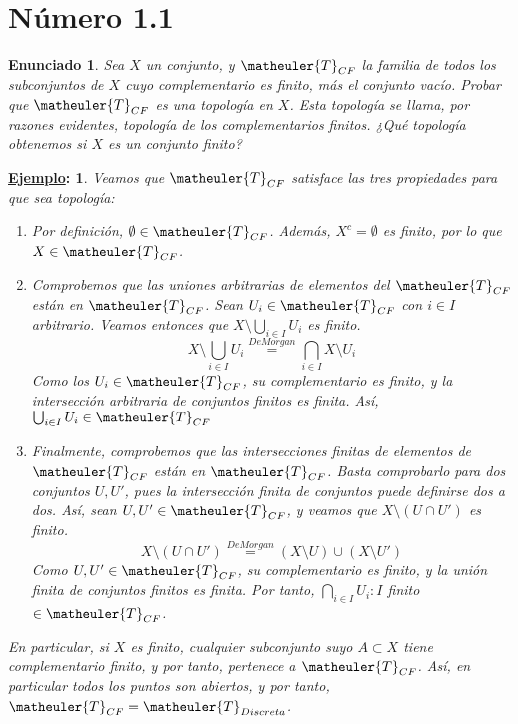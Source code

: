 \documentclass[10pt,a4paper,openright]{book}
\theoremstyle{break}
\newtheorem*{enun}{Enunciado}
\newtheorem*{ej}{\underline{Ejemplo}:}
\begin{document}
\section{Número 1.1}
\begin{enun}
Sea $X$ un conjunto, y $\matheuler{T}_{CF}$ la familia de todos los subconjuntos de $X$ cuyo complementario es finito, más el conjunto vacío. Probar que $\matheuler{T}_{CF}$ es una topología en $X$. Esta topología se llama, por razones evidentes, \textit{topología de los complementarios finitos}. ¿Qué topología obtenemos si $X$ es un conjunto finito?
\end{enun}
\begin{ej}
Veamos que $\matheuler{T}_{CF}$ satisface las tres propiedades para que sea topología:
\begin{enumerate}[label={(\arabic*)}]
\item Por definición, $\emptyset \in \matheuler{T}_{CF}$. Además, $X^c = \emptyset$ es finito, por lo que $X \in \matheuler{T}_{CF}$.
\item Comprobemos que las uniones arbitrarias de elementos del $\matheuler{T}_{CF}$ están en $\matheuler{T}_{CF}$. Sean $U_i \in \matheuler{T}_{CF}$ con $i \in I$ arbitrario. Veamos entonces que $X \setminus \bigcup_{i \in I} U_i$ es finito.
$$X \setminus \bigcup_{i \in I} U_i \overset{De Morgan}{=} \bigcap_{i \in I}X \setminus U_i$$
Como los $U_i \in \matheuler{T}_{CF}$, su complementario es finito, y la intersección arbitraria de conjuntos finitos es finita. Así, $\bigcup_{i \in I} U_i \in \matheuler{T}_{CF}$
\item Finalmente, comprobemos que las intersecciones finitas de elementos de $\matheuler{T}_{CF}$ están en $\matheuler{T}_{CF}$. Basta comprobarlo para dos conjuntos $U, U'$, pues la intersección finita de conjuntos puede definirse dos a dos. Así, sean $U, U' \in \matheuler{T}_{CF}$, y veamos que $X \setminus (U \cap U')$ es finito.
$$X \setminus (U \cap U') \overset{De Morgan}{=} (X \setminus U) \cup (X \setminus U')$$
Como $U, U' \in \matheuler{T}_{CF}$, su complementario es finito, y la unión finita de conjuntos finitos es finita. Por tanto, $\bigcap_{i \in I} U_i : I $ finito $\in \matheuler{T}_{CF}$.
\end{enumerate}
En particular, si $X$ es finito, cualquier subconjunto suyo $A \subset X$ tiene complementario finito, y por tanto, pertenece a $\matheuler{T}_{CF}$. Así, en particular todos los puntos son abiertos, y por tanto, $\matheuler{T}_{CF} = \matheuler{T}_{Discreta}$.
\end{ej}
\end{document}
